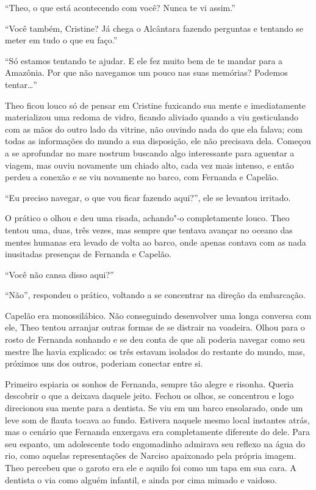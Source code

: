 ``Theo, o que está acontecendo com você? Nunca te vi assim.''

``Você também, Cristine? Já chega o Alcântara fazendo perguntas e
tentando se meter em tudo o que eu faço.''

``Só estamos tentando te ajudar. E ele fez muito bem de te mandar para a
Amazônia. Por que não navegamos um pouco nas suas memórias? Podemos
tentar\ldots{}''

Theo ficou louco só de pensar em Cristine fuxicando sua mente e
imediatamente materializou uma redoma de vidro, ficando aliviado quando
a viu gesticulando com as mãos do outro lado da vitrine, não ouvindo
nada do que ela falava; com todas as informações do mundo a sua
disposição, ele não precisava dela. Começou a se aprofundar no mare
nostrum buscando algo interessante para aguentar a viagem, mas ouviu
novamente um chiado alto, cada vez mais intenso, e então perdeu a conexão
e se viu novamente no barco, com Fernanda e Capelão.

``Eu preciso navegar, o que vou ficar fazendo aqui?'', ele se levantou
irritado.

O prático o olhou e deu uma risada, achando"-o completamente louco. Theo
tentou uma, duas, três vezes, mas sempre que tentava avançar no oceano
das mentes humanas era levado de volta ao barco, onde apenas contava com
as nada inusitadas presenças de Fernanda e Capelão.

``Você não cansa disso aqui?''

``Não'', respondeu o prático, voltando a se concentrar na direção da
embarcação.

Capelão era monossilábico. Não conseguindo desenvolver uma longa
conversa com ele, Theo tentou arranjar outras formas de se distrair na
voadeira. Olhou para o rosto de Fernanda sonhando e se deu conta de que
ali poderia navegar como seu mestre lhe havia explicado: os três estavam
isolados do restante do mundo, mas, próximos uns dos outros, poderiam
conectar entre si.

Primeiro espiaria os sonhos de Fernanda, sempre tão alegre e risonha.
Queria descobrir o que a deixava daquele jeito. Fechou os olhos, se
concentrou e logo direcionou sua mente para a dentista. Se viu em um
barco ensolarado, onde um leve som de flauta tocava ao fundo. Estivera
naquele mesmo local instantes atrás, mas o cenário que Fernanda
enxergava era completamente diferente do dele. Para seu espanto, um
adolescente todo engomadinho admirava seu reflexo na água do rio,
como aquelas representações de Narciso apaixonado pela própria
imagem. Theo percebeu que o garoto era ele e aquilo foi como um tapa em
sua cara. A dentista o via como alguém infantil, e ainda por cima mimado
e vaidoso.


